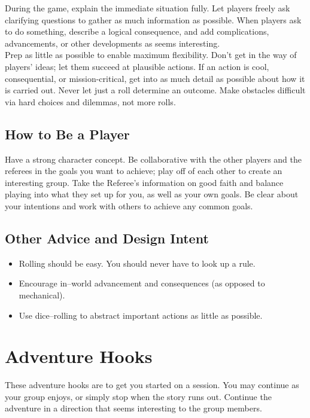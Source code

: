 \documentclass[landscape]{book}
\begin{document}
\begin{multicols*}{4}
During the game, explain the immediate situation fully.
Let players freely ask clarifying questions to gather as much information as possible.
When players ask to do something, describe a logical consequence, and add complications, advancements, or other developments as seems interesting. \\

Prep as little as possible to enable maximum flexibility.
Don't get in the way of players' ideas; let them succeed at plausible actions.
If an action is cool, consequential, or mission-critical, get into as much detail as possible about how it is carried out.
Never let just a roll determine an outcome.
Make obstacles difficult via hard choices and dilemmas, not more rolls. \\

\subsection*{How to Be a Player}

Have a strong character concept.
Be collaborative with the other players and the referees in the goals you want to achieve; play off of each other to create an interesting group.
Take the Referee's information on good faith and balance playing into what they set up for you, as well as your own goals.
Be clear about your intentions and work with others to achieve any common goals. \\

\subsection*{Other Advice and Design Intent}

\begin{itemize}
\item Rolling should be easy. You should never have to look up a rule.
\item Encourage in--world advancement and consequences (as opposed to mechanical).
\item Use dice--rolling to abstract important actions as little as possible.
\end{itemize}

\section*{Adventure Hooks}

These adventure hooks are to get you started on a session.
You may continue as your group enjoys, or simply stop when the story runs out.
Continue the adventure in a direction that seems interesting to the group members. \\


\end{multicols*}
\end{document}
